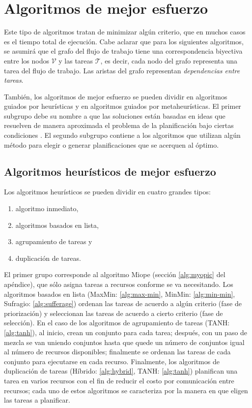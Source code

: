 \section{Algoritmos de mejor esfuerzo}
Este tipo de algoritmos tratan de minimizar algún criterio, que en muchos casos es el tiempo total de ejecución. Cabe aclarar que para los siguientes algoritmos, se asumirá que el grafo del flujo de trabajo tiene una correspondencia biyectiva entre los nodos $\mathcal{V}$ y las tareas $\mathcal{T}$, es decir, cada nodo del grafo representa una tarea del flujo de trabajo. Las aristas del grafo representan \emph{dependencias entre tareas}.

También, los algoritmos de mejor esfuerzo se pueden dividir en algoritmos guiados por heurísticas y en algoritmos guiados por metaheurísticas. El primer subgrupo debe su nombre a que las soluciones están basadas en ideas que resuelven de manera aproximada el problema de la planificación bajo ciertas condiciones \cite{yu2008workflow}. El segundo subgrupo contiene a los algoritmos que utilizan algún método para elegir o generar planificaciones que se acerquen al óptimo.

\subsection{Algoritmos heurísticos de mejor esfuerzo}
Los algoritmos heurísticos se pueden dividir en cuatro grandes tipos: 
\begin{enumerate}
\item{algoritmo inmediato,}
\item{algoritmos basados en lista,}
\item{agrupamiento de tareas y}
\item{duplicación de tareas.}
\end{enumerate}

El primer grupo corresponde al algoritmo Miope (sección \ref{alg:myopic} del apéndice), que sólo asigna tareas a recursos conforme se va necesitando. Los algoritmos basados en lista (MaxMin: \ref{alg:max-min}, MinMin: \ref{alg:min-min}, Sufragio: \ref{alg:sufferage}) ordenan las tareas de acuerdo a algún criterio (fase de priorización) y seleccionan las tareas de acuerdo a cierto criterio (fase de selección). En el caso de los algoritmos de agrupamiento de tareas (TANH: \ref{alg:tanh}), al inicio, crean un conjunto para cada tarea; después, con un paso de mezcla se van uniendo conjuntos hasta que quede un número de conjuntos igual al número de recursos disponibles; finalmente se ordenan las tareas de cada conjunto para ejecutarse en cada recurso. Finalmente, los algoritmos de duplicación de tareas (Híbrido: \ref{alg:hybrid}, TANH: \ref{alg:tanh}) planifican una tarea en varios recursos con el fin de reducir el costo por comunicación entre recursos; cada uno de estos algoritmos se caracteriza por la manera en que eligen las tareas a planificar.

